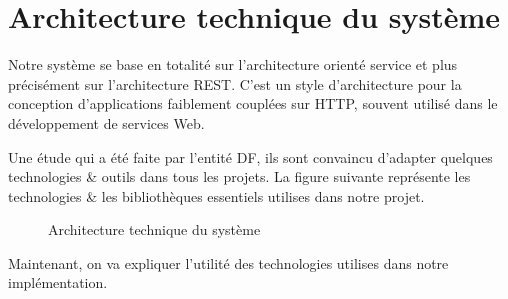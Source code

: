 \section{Architecture technique du syst\`eme}

Notre syst\`eme se base en totalit\'e sur l'architecture orient\'e service et plus pr\'ecis\'ement sur l'architecture \gls{REST}. C'est un style d'architecture pour la conception d'applications faiblement coupl\'ees sur \gls{HTTP}, souvent utilis\'e dans le d\'eveloppement de services Web.

Une \'etude qui a \'et\'e faite par l'entit\'e \gls{DF}, ils sont convaincu d'adapter quelques technologies \& outils dans tous les projets. La figure suivante repr\'esente les technologies \& les biblioth\`eques essentiels utilises dans notre projet.

\begin{figure}[H]
	\caption{\label{fig:my-label} Architecture technique du syst\`eme}
\end{figure}

Maintenant, on va expliquer l'utilit\'e des technologies utilises dans notre impl\'ementation. 

